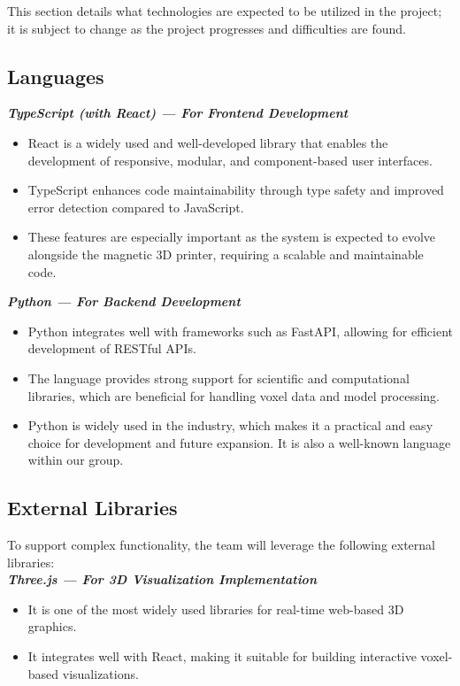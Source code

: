 \documentclass{article}
\begin{document}
\fi

This section details what technologies are expected to be utilized in the project; it is subject
to change as the project progresses and difficulties are found.\\

\subsection{Languages}

\textbf{\textit{TypeScript (with React) — For Frontend Development}}
\begin{itemize}
  \item React is a widely used and well-developed library that enables the development of responsive, modular, and component-based user interfaces.
  \item TypeScript enhances code maintainability through type safety and improved error detection compared to JavaScript.
  \item These features are especially important as the system is expected to evolve alongside the magnetic 3D printer, requiring a scalable and maintainable code.
\end{itemize}

\textbf{\textit{Python — For Backend Development}}
\begin{itemize}
  \item Python integrates well with frameworks such as FastAPI, allowing for efficient development of RESTful APIs.
  \item The language provides strong support for scientific and computational libraries, which are beneficial for handling voxel data and model processing.
  \item Python is widely used in the industry, which makes it a practical and easy choice for development and future expansion. It is also a well-known language within our group.
\end{itemize}

\subsection{External Libraries}

To support complex functionality, the team will leverage the following external libraries:\\

\textbf{\textit{Three.js — For 3D Visualization Implementation}}
\begin{itemize}
  \item It is one of the most widely used libraries for real-time web-based 3D graphics.
  \item It integrates well with React, making it suitable for building interactive voxel-based visualizations.
\end{itemize}
\end{document}

